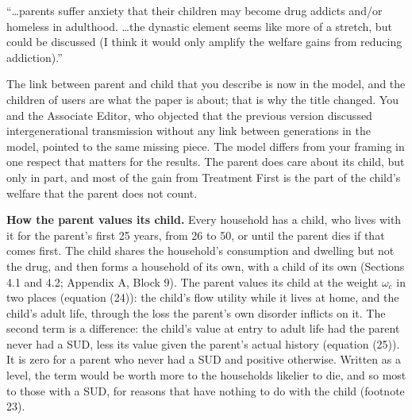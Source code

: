 \documentclass[11pt]{article}
\begin{document}
\begin{referee}
``\dots parents suffer anxiety that their children may become drug addicts and/or
homeless in adulthood. \dots the dynastic element seems like more of a stretch,
but could be discussed (I think it would only amplify the welfare gains from
reducing addiction).''
\end{referee}
\begin{response}
\newresult The link between parent and child that you describe is now in the model, and
the children of users are what the paper is about; that is why the title changed. You and
the Associate Editor, who objected that the previous version discussed intergenerational
transmission without any link between generations in the model, pointed to the same
missing piece. The model differs from your framing in one respect that matters for the
results. The parent does care about its child, but only in part, and most of the gain from
Treatment First is the part of the child's welfare that the parent does not count.

\textbf{How the parent values its child.} Every household has a child, who lives with it
for the parent's first 25 years, from 26 to 50, or until the parent dies if that comes
first. The child shares the household's consumption and dwelling but not the drug, and then
forms a household of its own, with a child of its own (Sections 4.1 and 4.2; Appendix A,
Block 9). The parent values its child at the weight $\omega_c$ in two places (equation
(24)): the child's flow utility while it lives at home, and the child's adult life, through
the loss the parent's own disorder inflicts on it. The second term is a difference: the
child's value at entry to adult life had the parent never had a SUD, less its value given
the parent's actual history (equation (25)). It is zero for a parent who never had a SUD and
positive otherwise. Written as a level, the term would be worth more to the households
likelier to die, and so most to those with a SUD, for reasons that have nothing to do with
the child (footnote 23).


\end{response}
\end{document}

